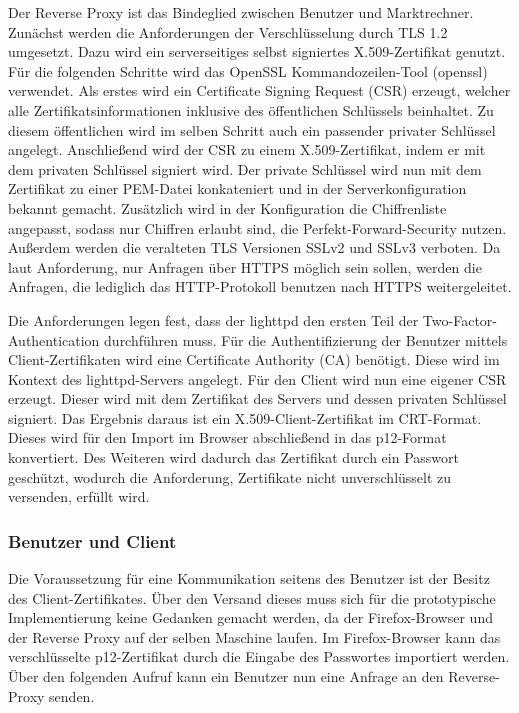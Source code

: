 \documentclass[11pt,a4paper]{report}
\begin{document}
Der Reverse Proxy ist das Bindeglied zwischen Benutzer und Marktrechner. Zunächst werden die Anforderungen der Verschlüsselung durch TLS 1.2 umgesetzt. Dazu wird ein serverseitiges selbst signiertes X.509-Zertifikat genutzt. Für die folgenden Schritte wird das OpenSSL Kommandozeilen-Tool (openssl) verwendet. Als erstes wird ein Certificate Signing Request (CSR) erzeugt, welcher alle Zertifikatsinformationen inklusive des öffentlichen Schlüssels beinhaltet. Zu diesem öffentlichen wird im selben Schritt auch ein passender privater Schlüssel angelegt. Anschließend wird der CSR zu einem X.509-Zertifikat, indem er mit dem privaten Schlüssel signiert wird. Der private Schlüssel wird nun mit dem Zertifikat zu einer PEM-Datei konkateniert und in der Serverkonfiguration bekannt gemacht. Zusätzlich wird in der Konfiguration die Chiffrenliste angepasst, sodass nur Chiffren erlaubt sind, die Perfekt-Forward-Security nutzen. Außerdem werden die veralteten TLS Versionen SSLv2 und SSLv3 verboten. Da laut Anforderung, nur Anfragen über HTTPS möglich sein sollen, werden die Anfragen, die lediglich das HTTP-Protokoll benutzen nach HTTPS weitergeleitet.

Die Anforderungen legen fest, dass der lighttpd den ersten Teil der Two-Factor-Authentication durchführen muss. Für die Authentifizierung der Benutzer mittels Client-Zertifikaten wird eine Certificate Authority (CA) benötigt. Diese wird im Kontext des lighttpd-Servers angelegt. Für den Client wird nun eine eigener CSR erzeugt. Dieser wird mit dem Zertifikat des Servers und dessen privaten Schlüssel signiert. Das Ergebnis daraus ist ein X.509-Client-Zertifikat im CRT-Format. Dieses wird für den Import im Browser abschließend in das p12-Format konvertiert. Des Weiteren wird dadurch das Zertifikat durch ein Passwort geschützt, wodurch die Anforderung, Zertifikate nicht unverschlüsselt zu versenden, erfüllt wird.

\subsubsection{Benutzer und Client}

Die Voraussetzung für eine Kommunikation seitens des Benutzer ist der Besitz des Client-Zertifikates. Über den Versand dieses muss sich für die prototypische Implementierung keine Gedanken gemacht werden, da der Firefox-Browser und der Reverse Proxy auf der selben Maschine laufen. Im Firefox-Browser kann das verschlüsselte p12-Zertifikat durch die Eingabe des Passwortes importiert werden. Über den folgenden Aufruf kann ein Benutzer nun eine Anfrage an den Reverse-Proxy senden. 
\end{document}
